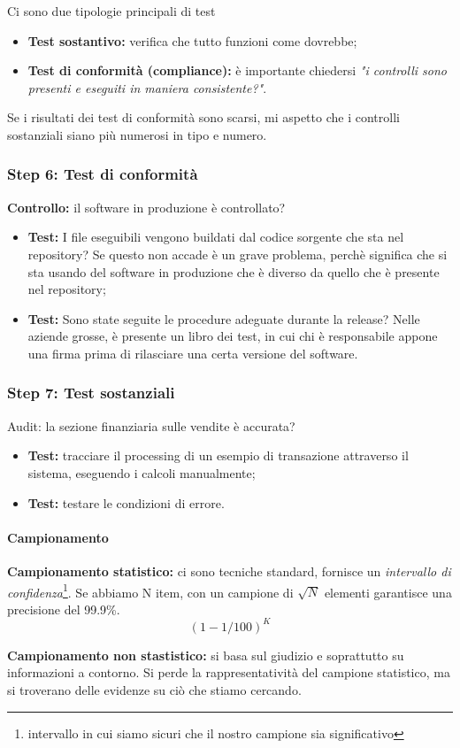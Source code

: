 Ci sono due tipologie principali di test
\begin{itemize}
\item \textbf{Test sostantivo:} verifica che tutto funzioni come dovrebbe;
\item \textbf{Test di conformità (compliance):} è importante chiedersi  \textit{"i controlli 
sono presenti e eseguiti in maniera consistente?"}.
\end{itemize}

Se i risultati dei test di conformità sono scarsi, mi aspetto che i controlli 
sostanziali siano più numerosi in tipo e numero.

\subsubsection{Step 6: Test di conformità}

\textbf{Controllo:} il software in produzione è controllato?
\begin{itemize}
\item \textbf{Test:} I file eseguibili vengono buildati dal codice sorgente che sta nel 
repository? Se questo non accade è un grave problema, perchè significa che si 
sta usando del software in produzione che è diverso da quello che è presente 
nel repository;
\item \textbf{Test:} Sono state seguite le procedure adeguate durante la release? Nelle 
aziende grosse, è presente un libro dei test, in cui chi è responsabile appone 
una firma prima di rilasciare una certa versione del software.
\end{itemize}


\subsubsection{Step 7: Test sostanziali}

Audit: la sezione finanziaria sulle vendite è accurata? 

\begin{itemize}
\item \textbf{Test:} tracciare il processing di un esempio di transazione attraverso il 
sistema, eseguendo i calcoli manualmente;
\item \textbf{Test:} testare le condizioni di errore.
\end{itemize}


\paragraph{Campionamento}

\textbf{Campionamento statistico:} ci sono tecniche standard, fornisce un 
\textit{intervallo di confidenza}\footnote{intervallo in cui siamo sicuri che il nostro 
campione sia significativo}. Se abbiamo N item, con un campione di $\sqrt{N}$ 
elementi garantisce una precisione del 99.9\%.
$$
(1 - 1/100)^K
$$

\textbf{Campionamento non stastistico:} si basa sul giudizio e soprattutto su 
informazioni a contorno. Si perde la rappresentatività del campione statistico, 
ma si troverano delle evidenze su ciò che stiamo cercando.
